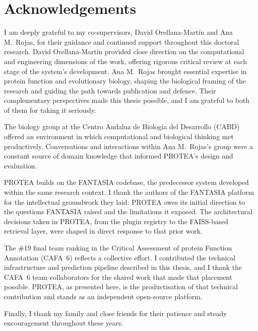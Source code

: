 \chapter*{Acknowledgements}

I am deeply grateful to my co-supervisors, David Orellana-Mart\'{i}n and
Ana M.\ Rojas, for their guidance and continued support throughout this
doctoral research. David Orellana-Mart\'{i}n provided close direction on
the computational and engineering dimensions of the work, offering
rigorous critical review at each stage of the system's development.
Ana M.\ Rojas brought essential expertise in protein function and
evolutionary biology, shaping the biological framing of the research
and guiding the path towards publication and defence. Their
complementary perspectives made this thesis possible, and I am grateful
to both of them for taking it seriously.

The biology group at the Centro Andaluz de Biolog\'{i}a del Desarrollo
(CABD) offered an environment in which computational and biological
thinking met productively. Conversations and interactions within
Ana M.\ Rojas's group were a constant source of domain knowledge that
informed PROTEA's design and evaluation.

PROTEA builds on the FANTASIA codebase, the predecessor system developed
within the same research context. I thank the authors of the FANTASIA
platform for the intellectual groundwork they laid: PROTEA owes its
initial direction to the questions FANTASIA raised and the limitations
it exposed. The architectural decisions taken in PROTEA, from the
plugin registry to the FAISS-based retrieval layer, were shaped in
direct response to that prior work.

The \#19 final team ranking in the Critical Assessment of protein
Function Annotation (CAFA~6) reflects a collective effort. I contributed
the technical infrastructure and prediction pipeline described in this
thesis, and I thank the CAFA~6 team collaborators for the shared work
that made that placement possible. PROTEA, as presented here, is the
productisation of that technical contribution and stands as an
independent open-source platform.

Finally, I thank my family and close friends for their patience and
steady encouragement throughout these years.
